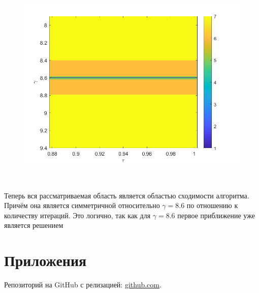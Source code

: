 \documentclass[12pt,a4paper]{scrartcl}
\begin{document}
\begin{figure}[H]
    \centering
    \includegraphics[width=14cm, height=10cm]{fig/newx0.png}
\end{figure}

Теперь вся рассматриваемая область является областью сходимости алгоритма. Причём она является симметричной относительно $\gamma = 8.6$ по отношению к количеству итераций. Это логично, так как для $\gamma = 8.6$ первое приближение уже является решением

\section{Приложения}
Репозиторий на GitHub с релизацией: \href{https://github.com/WiillyWonka/Intervals}{github.com}.
\end{document}
